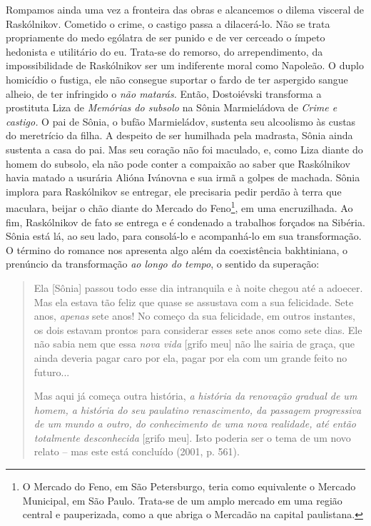 Rompamos ainda uma vez a fronteira das obras e alcancemos o dilema
visceral de Raskólnikov. Cometido o crime, o castigo passa a
dilacerá-lo. Não se trata propriamente do medo ególatra de ser punido e
de ver cerceado o ímpeto hedonista e utilitário do eu. Trata-se do
remorso, do arrependimento, da impossibilidade de Raskólnikov ser um
indiferente moral como Napoleão. O duplo homicídio o fustiga, ele não
consegue suportar o fardo de ter aspergido sangue alheio, de ter
infringido o \emph{não matarás.} Então, Dostoiévski transforma a
prostituta Liza de \emph{Memórias do subsolo} na Sônia Marmieládova de
\emph{Crime e castigo.} O pai de Sônia, o bufão Marmieládov, sustenta
seu alcoolismo às custas do meretrício da filha. A despeito de ser
humilhada pela madrasta, Sônia ainda sustenta a casa do pai. Mas seu
coração não foi maculado, e, como Liza diante do homem do subsolo, ela
não pode conter a compaixão ao saber que Raskólnikov havia matado a
usurária Alióna Ivánovna e sua irmã a golpes de machada. Sônia implora
para Raskólnikov se entregar, ele precisaria pedir perdão à terra que
maculara, beijar o chão diante do Mercado do Feno\footnote{O Mercado do
  Feno, em São Petersburgo, teria como equivalente o Mercado Municipal,
  em São Paulo. Trata-se de um amplo mercado em uma região central e
  pauperizada, como a que abriga o Mercadão na capital paulistana.}, em
uma encruzilhada. Ao fim, Raskólnikov de fato se entrega e é condenado a
trabalhos forçados na Sibéria. Sônia está lá, ao seu lado, para
consolá-lo e acompanhá-lo em sua transformação. O término do romance nos
apresenta algo além da coexistência bakhtiniana, o prenúncio da
transformação \emph{ao longo do tempo}, o sentido da superação:

\begin{quote}
Ela {[}Sônia{]} passou todo esse dia intranquila e à noite chegou até a
adoecer. Mas ela estava tão feliz que quase se assustava com a sua
felicidade. Sete anos, \emph{apenas} sete anos! No começo da sua
felicidade, em outros instantes, os dois estavam prontos para considerar
esses sete anos como sete dias. Ele não sabia nem que essa \emph{nova
vida} {[}grifo meu{]} não lhe sairia de graça, que ainda deveria pagar
caro por ela, pagar por ela com um grande feito no futuro...

Mas aqui já começa outra história, \emph{a história da renovação gradual
de um homem, a história do seu paulatino renascimento, da passagem
progressiva de um mundo a outro, do conhecimento de uma nova realidade,
até então totalmente desconhecida} {[}grifo meu{]}. Isto poderia ser o
tema de um novo relato -- mas este está concluído (2001, p. 561).
\end{quote}

